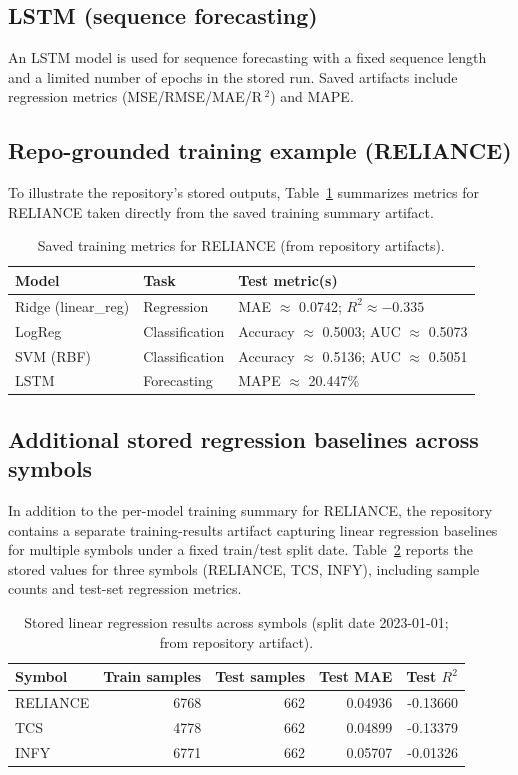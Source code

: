 \documentclass{svproc}
\begin{document}
\subsection{LSTM (sequence forecasting)}
An LSTM model is used for sequence forecasting with a fixed sequence length and a limited number of epochs in the stored run. Saved artifacts include regression metrics (MSE/RMSE/MAE/R\,$^2$) and MAPE.

\subsection{Repo-grounded training example (RELIANCE)}\label{sec:reliance}
To illustrate the repository's stored outputs, Table~\ref{tab:reliance_metrics} summarizes metrics for RELIANCE taken directly from the saved training summary artifact.

\begin{table}[h!]
\centering
\caption{Saved training metrics for RELIANCE (from repository artifacts).}
\label{tab:reliance_metrics}
\begin{tabular}{|l|l|l|}
\hline
Model & Task & Test metric(s) \\
\hline
Ridge (linear\_reg) & Regression & MAE $\approx$ 0.0742; $R^2 \approx -0.335$ \\
LogReg & Classification & Accuracy $\approx$ 0.5003; AUC $\approx$ 0.5073 \\
SVM (RBF) & Classification & Accuracy $\approx$ 0.5136; AUC $\approx$ 0.5051 \\
LSTM & Forecasting & MAPE $\approx$ 20.447\% \\
\hline
\end{tabular}
\end{table}

\subsection{Additional stored regression baselines across symbols}\label{sec:more_training}
In addition to the per-model training summary for RELIANCE, the repository contains a separate training-results artifact capturing linear regression baselines for multiple symbols under a fixed train/test split date. Table~\ref{tab:linear_multi} reports the stored values for three symbols (RELIANCE, TCS, INFY), including sample counts and test-set regression metrics.

\begin{table}[h!]
\centering
\caption{Stored linear regression results across symbols (split date 2023-01-01; from repository artifact).}
\label{tab:linear_multi}
\begin{tabular}{|l|r|r|r|r|}
\hline
Symbol & Train samples & Test samples & Test MAE & Test $R^2$ \\
\hline
RELIANCE & 6768 & 662 & 0.04936 & -0.13660 \\
TCS & 4778 & 662 & 0.04899 & -0.13379 \\
INFY & 6771 & 662 & 0.05707 & -0.01326 \\
\hline
\end{tabular}
\end{table}
\end{document}
